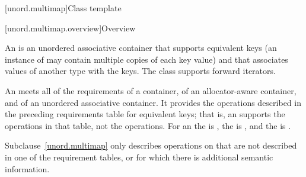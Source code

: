 [unord.multimap]{Class template }%

[unord.multimap.overview]{Overview}

\pnum
{}%
%
An  is an unordered associative container
that supports equivalent keys (an instance of  may contain
multiple copies of each key value) and that associates values of
another type  with the keys.
The  class
supports forward iterators.

\pnum
An  meets all of the requirements
of a container,
of an allocator-aware container, and
of an unordered associative container.
It provides the operations described in the
preceding requirements table for equivalent keys; that is, an 
supports the  operations in that table, not the  operations.
For an  the  is ,
the  is ,
and the  is .

\pnum
Subclause~\ref{unord.multimap} only describes operations on 
that are not described in one of the requirement tables, or for which
there is additional semantic information.

